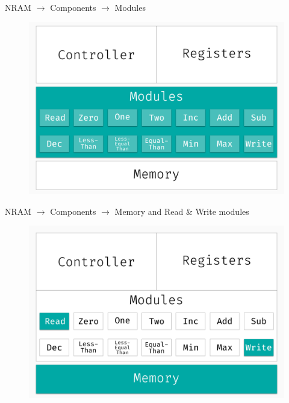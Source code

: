 \documentclass[xcolor={usenames}]{beamer}
\begin{document}
  \begin{frame}{NRAM \(\rightarrow\) Components \(\rightarrow\)  Modules}
  	\begin{figure}
  		\centering
  		\includegraphics[width=\textwidth]{../figures/schema-nram-with-memory-MODULES.png}
  	\end{figure}
  \end{frame}

  \begin{frame}{NRAM \(\rightarrow\) Components \(\rightarrow\)  Memory and Read \& Write modules}
  	\begin{figure}
  		\centering
  		\includegraphics[width=\textwidth]{../figures/schema-nram-with-memory-READ_WRITE_MEMORY.png}
  	\end{figure}
  \end{frame}
\end{document}
